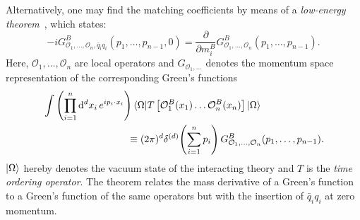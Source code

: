 Alternatively, one may find the matching coefficients by means of a \textit{low-energy theorem}~\cite{Kniehl:1994ju, Kniehl:1995tn, Chetyrkin:1997un}, which states:
\begin{equation}
-i G_{\mathcal{O}_1,\dots,\mathcal{O}_n, \bar{q}_i q_i}^B(p_1, \ldots, p_{n - 1}, 0)  = \frac{\partial}{\partial m_i^B} G_{\mathcal{O}_1,\dots , \mathcal{O}_n}^B (p_1, \ldots, p_{n - 1}).
\label{eq:4:LET}
\end{equation}
Here, $\mathcal{O}_1, \ldots , \mathcal{O}_n$ are local operators and $G_{\mathcal{O}_1,\dots} $ denotes the momentum space representation of the corresponding Green's functions
\begin{equation}
\begin{split}
& \int \left(\prod_{i = 1}^n \dd^d x_i \, e^{i p_i\cdot x_i} \right) \braket{\Omega | T \left[ \mathcal{O}_1^B(x_1) \dots \mathcal{O}_n^B(x_n) \right] | \Omega}  \\
& \hspace{3cm} \equiv (2 \pi)^d \delta^{(d)}\! \left(\sum_{i = 1}^n p_i \right) G_{\mathcal{O}_1,\dots, \mathcal{O}_n}^B(p_1, \ldots , p_{n - 1}) .
\end{split}
\end{equation}
$\ket{\Omega}$ hereby denotes the vacuum state of the interacting theory and $T$ is the \textit{time ordering operator}. The theorem relates the mass derivative of a Green's function to a Green's function of the same operators but with the insertion of $\bar{q}_i q_i$ at zero momentum.

